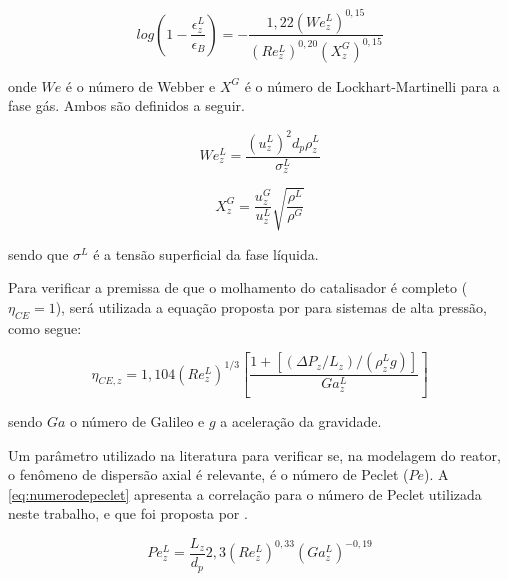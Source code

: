 \begin{equation}
log \left (1-\dfrac{\epsilon_{z}^L}{\epsilon_B} \right) =
-\dfrac{1,22(We_{z}^L)^{0,15}}{(Re_{z}^L)^{0,20}(X_{z}^G)^{0,15}}
\label{eq:epsilonL}
\end{equation}

onde $We$ é o número de Webber e $X^G$ é o número de Lockhart-Martinelli
para a fase gás. Ambos são definidos a seguir.

\begin{equation}
We_{z}^L = \dfrac{(u_{z}^L)^2d_p\rho_{z}^L}{\sigma_{z}^L}
\label{eq:webber}
\end{equation}

\begin{equation}
X_{z}^G = \dfrac{u_{z}^G}{u_z^L} \sqrt{\dfrac{\rho^L}{\rho^G}}
\label{eq:X}
\end{equation}

sendo que $\sigma^L$ é a tensão superficial da fase líquida.


Para verificar a premissa de que o molhamento do catalisador é completo
($\eta_{CE} = 1$), será utilizada a equação proposta por
 para sistemas de alta pressão, como segue:

\begin{equation}
\eta_{CE,z} = 1,104(Re_z^L)^{1/3} \left [
\dfrac{1 + [(\Delta P_z/L_{z})/(\rho_{z}^L g)]}{Ga_{z}^{L}} \right ]
\label{eq:molhamento}
\end{equation}

sendo $Ga$ o número de Galileo e $g$ a aceleração da gravidade.


Um parâmetro utilizado na literatura para verificar se, na modelagem do reator,
o fenômeno de dispersão axial é relevante, é o número de Peclet ($Pe$).
A \autoref{eq:numerodepeclet} apresenta a correlação para o número de
Peclet utilizada neste trabalho, e que foi proposta por
.

\begin{equation}
Pe_z^L = \dfrac{L_z}{d_p} 2,3(Re_z^L)^{0,33}(Ga_{z}^{L})^{-0,19}
\label{eq:numerodepeclet}
\end{equation}


